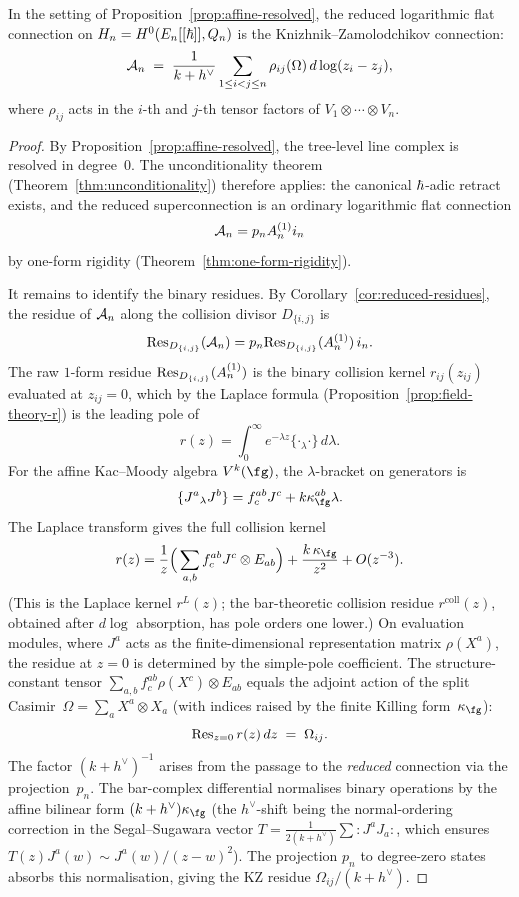 \begin{theorem}
\label{thm:reduced-equals-kz}
In the setting of Proposition~\textup{\ref{prop:affine-resolved}}, the reduced logarithmic flat connection on $H_n = H^0(E_n[[\hbar]], Q_n)$ is the Knizhnik--Zamolodchikov connection:
\[
 \mathcal A_n \;=\; \frac{1}{k + h^\vee}\sum_{1 \leq i < j \leq n} \rho_{ij}(\Omega)\, d\log(z_i - z_j),
\]
where $\rho_{ij}$ acts in the $i$-th and $j$-th tensor factors of\/ $V_1 \otimes \cdots \otimes V_n$.
\end{theorem}

\begin{proof}
By Proposition~\ref{prop:affine-resolved}, the tree-level line complex is resolved in degree~$0$. The unconditionality theorem (Theorem~\ref{thm:unconditionality}) therefore applies: the canonical $\hbar$-adic retract exists, and the reduced superconnection is an ordinary logarithmic flat connection
\[
 \mathcal A_n = p_n A_n^{(1)} i_n
\]
by one-form rigidity (Theorem~\ref{thm:one-form-rigidity}).

It remains to identify the binary residues. By Corollary~\ref{cor:reduced-residues}, the residue of $\mathcal A_n$ along the collision divisor $D_{\{i,j\}}$ is
\[
 \mathrm{Res}_{D_{\{i,j\}}}(\mathcal A_n) = p_n \mathrm{Res}_{D_{\{i,j\}}}(A_n^{(1)}) \, i_n.
\]
The raw $1$-form residue $\mathrm{Res}_{D_{\{i,j\}}}(A_n^{(1)})$ is the binary collision kernel $r_{ij}(z_{ij})$ evaluated at $z_{ij} = 0$, which by the Laplace formula (Proposition~\ref{prop:field-theory-r}) is the leading pole of
\[
 r(z) = \int_0^\infty e^{-\lambda z} \{\cdot{}_\lambda \cdot\}\, d\lambda.
\]
For the affine Kac--Moody algebra $V^k(\fg)$, the $\lambda$-bracket on generators is
\[
 \{J^a{}_\lambda J^b\} = f^{ab}_c J^c + k \kappa_\fg^{ab} \lambda.
\]
The Laplace transform gives the full collision kernel
\[
 r(z) = \frac{1}{z}\Big(\sum_{a,b} f^{ab}_c J^c \otimes E_{ab}\Big) + \frac{k\,\kappa_\fg}{z^2} + O(z^{-3}).
\]
\noindent
(This is the Laplace kernel $r^L(z)$; the bar-theoretic collision
residue $r^{\mathrm{coll}}(z)$, obtained after $d\log$ absorption,
has pole orders one lower.)
On evaluation modules, where $J^a$ acts as the finite-dimensional representation matrix $\rho(X^a)$, the residue at $z = 0$ is determined by the simple-pole coefficient. The structure-constant tensor $\sum_{a,b} f^{ab}_c \rho(X^c) \otimes E_{ab}$ equals the adjoint action of the split Casimir~$\Omega = \sum_a X^a \otimes X_a$ (with indices raised by the finite Killing form~$\kappa_\fg$):
\[
 \mathrm{Res}_{z=0}\, r(z)\,dz \;=\; \Omega_{ij}.
\]
The factor $(k + h^\vee)^{-1}$ arises from the passage to the \emph{reduced} connection via the projection~$p_n$. The bar-complex differential normalises binary operations by the affine bilinear form $(k + h^\vee)\kappa_\fg$ (the $h^\vee$-shift being the normal-ordering correction in the Segal--Sugawara vector $T = \tfrac{1}{2(k+h^\vee)} \sum{:}J^a J_a{:}$, which ensures $T(z)J^a(w) \sim J^a(w)/(z-w)^2$). The projection $p_n$ to degree-zero states absorbs this normalisation, giving the KZ residue $\Omega_{ij}/(k + h^\vee)$.


\end{proof}
